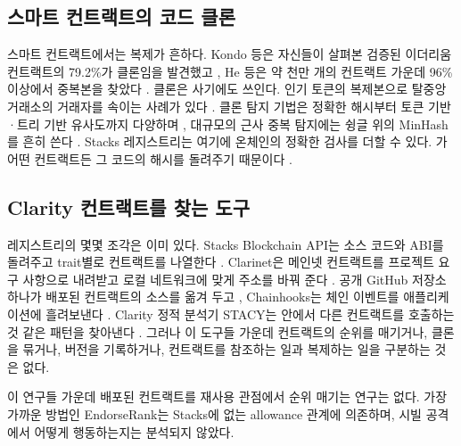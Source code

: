 \subsection{스마트 컨트랙트의 코드 클론}

스마트 컨트랙트에서는 복제가 흔하다. Kondo 등은 자신들이 살펴본 검증된 이더리움 컨트랙트의 79.2\%가 클론임을 발견했고 \cite{kondo2020cloning}, He 등은 약 천만 개의 컨트랙트 가운데 96\% 이상에서 중복본을 찾았다 \cite{he2020clones}. 클론은 사기에도 쓰인다. 인기 토큰의 복제본으로 탈중앙 거래소의 거래자를 속이는 사례가 있다 \cite{xia2021scam}. 클론 탐지 기법은 정확한 해시부터 토큰 기반·트리 기반 유사도까지 다양하며 \cite{roy2009clones}, 대규모의 근사 중복 탐지에는 슁글 위의 MinHash를 흔히 쓴다 \cite{broder1997resemblance}. Stacks 레지스트리는 여기에 온체인의 정확한 검사를 더할 수 있다. 가 어떤 컨트랙트든 그 코드의 해시를 돌려주기 때문이다 \cite{sip033}.

\subsection{Clarity 컨트랙트를 찾는 도구}

레지스트리의 몇몇 조각은 이미 있다. Stacks Blockchain API는 소스 코드와 ABI를 돌려주고 trait별로 컨트랙트를 나열한다 \cite{hiroapi}. Clarinet은 메인넷 컨트랙트를 프로젝트 요구 사항으로 내려받고 로컬 네트워크에 맞게 주소를 바꿔 준다 \cite{clarinet}. 공개 GitHub 저장소 하나가 배포된 컨트랙트의 소스를 옮겨 두고 \cite{boomcrypto}, Chainhooks는 체인 이벤트를 애플리케이션에 흘려보낸다 \cite{chainhooks2026}. Clarity 정적 분석기 STACY는  안에서 다른 컨트랙트를 호출하는 것 같은 패턴을 찾아낸다 \cite{stacy}. 그러나 이 도구들 가운데 컨트랙트의 순위를 매기거나, 클론을 묶거나, 버전을 기록하거나, 컨트랙트를 참조하는 일과 복제하는 일을 구분하는 것은 없다.

이 연구들 가운데 배포된 컨트랙트를 재사용 관점에서 순위 매기는 연구는 없다. 가장 가까운 방법인 EndorseRank는 Stacks에 없는 allowance 관계에 의존하며, 시빌 공격에서 어떻게 행동하는지는 분석되지 않았다.
